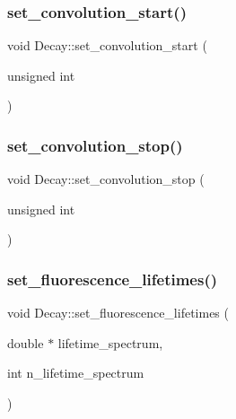 \mbox{\label{class_decay_a9d989db5da823f4eb62b2bed6f20cd3d}} 
\subsubsection{\texorpdfstring{set\+\_\+convolution\+\_\+start()}{set\_convolution\_start()}}
{\footnotesize\ttfamily void Decay\+::set\+\_\+convolution\+\_\+start (\begin{DoxyParamCaption}\item[{unsigned}]{int }\end{DoxyParamCaption})}

\mbox{\label{class_decay_a1ea9444adcde465036893d3ffd192e0c}} 
\subsubsection{\texorpdfstring{set\+\_\+convolution\+\_\+stop()}{set\_convolution\_stop()}}
{\footnotesize\ttfamily void Decay\+::set\+\_\+convolution\+\_\+stop (\begin{DoxyParamCaption}\item[{unsigned}]{int }\end{DoxyParamCaption})}

\mbox{\label{class_decay_aaf3a26b7bce1d44a5330a636a0d87654}} 
\subsubsection{\texorpdfstring{set\+\_\+fluorescence\+\_\+lifetimes()}{set\_fluorescence\_lifetimes()}}
{\footnotesize\ttfamily void Decay\+::set\+\_\+fluorescence\+\_\+lifetimes (\begin{DoxyParamCaption}\item[{double $\ast$}]{lifetime\+\_\+spectrum,  }\item[{int}]{n\+\_\+lifetime\+\_\+spectrum }\end{DoxyParamCaption})}

